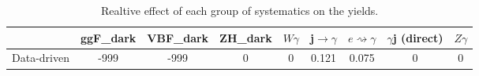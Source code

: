 \documentclass[10pt]{article}
\begin{document}
\begin{table}[htbp]
\begin{center}
\begin{tabular}{|c|c|c|c|c|c|c|c|c|}
\hline 
      & ggF_{dark}      & VBF_{dark}      & ZH_{dark}      & $W\gamma$      & j$\rightarrow\gamma$      & $e\rightsquigarrow\gamma$      & $\gamma$j (direct)      & $Z\gamma$ \\ 
\hline 
 Data-driven & -999 & -999 & 0 & 0 & 0.121 & 0.075 & 0 & 0 \\ 
\hline 
\end{tabular} 
\caption{Realtive effect of each group of systematics on the yields.} 
\end{center} 
\end{table} 
\end{document}
